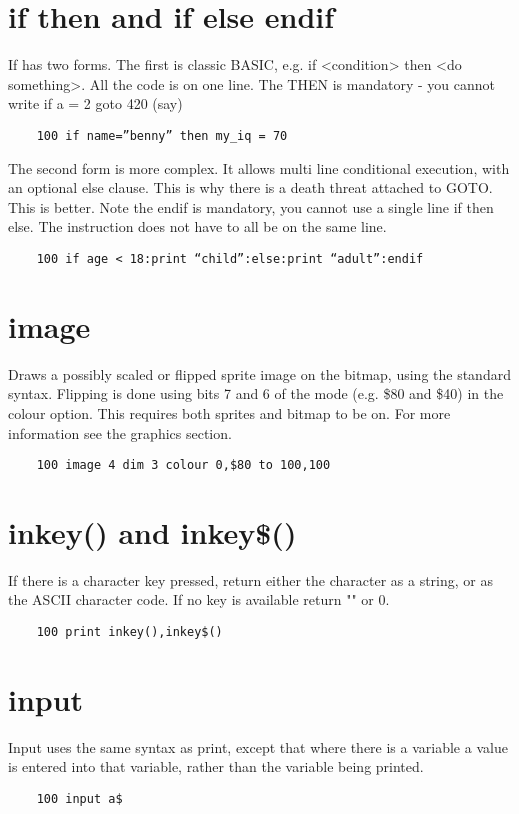 \section*{if then and if else endif}
If has two forms. The first is classic BASIC, e.g. if <condition> then <do something>. All the code is on one line. The THEN is mandatory - you cannot write if a = 2 goto 420 (say)
\example{}
\begin{verbatim}
	100 if name=”benny” then my_iq = 70
\end{verbatim}
The second form is more complex. It allows multi line conditional execution, with an optional else clause. This is why there is a death threat attached to GOTO. This is better.  Note the endif is mandatory, you cannot use a single line if then else. The instruction does not have to all be on the same line.
\example{}
\begin{verbatim}
	100 if age < 18:print “child”:else:print “adult”:endif
\end{verbatim}

\section*{image}
Draws a possibly scaled or flipped sprite image on the bitmap, using the standard syntax. Flipping is done using bits 7 and 6 of the mode (e.g. \$80 and \$40) in the colour option. This requires both sprites and bitmap to be on. For more information see the graphics section.
\example{}
\begin{verbatim}
	100 image 4 dim 3 colour 0,$80 to 100,100
\end{verbatim}

\section*{inkey() and inkey\$()}
If there is a character key pressed, return either the character as a string, or as the ASCII character code. If no key is available return "" or 0.
\example{}
\begin{verbatim}
	100 print inkey(),inkey$()
\end{verbatim}

\section*{input}
Input uses the same syntax as print, except that where there is a variable a value is entered into that variable, rather than the variable being printed.
\example{}
\begin{verbatim}
	100 input a$
\end{verbatim}

